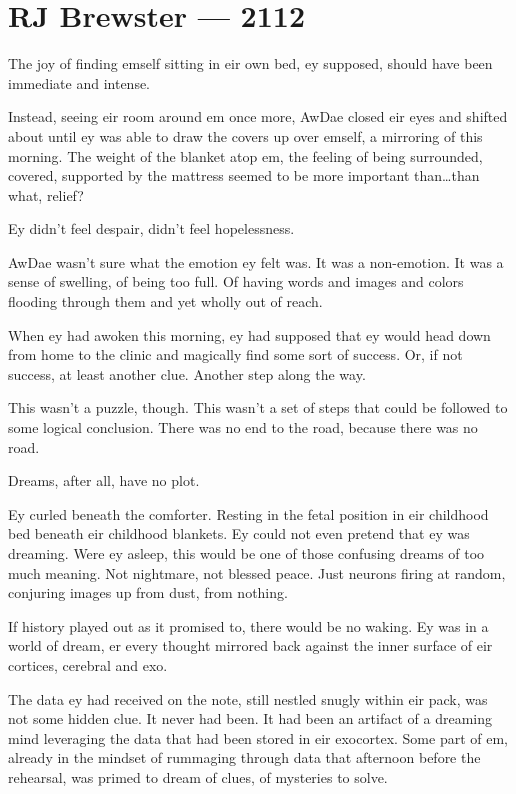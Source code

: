 \hypertarget{rj-brewster-2112}{%
\chapter*{RJ Brewster — 2112}\label{rj-brewster-2112}}

The joy of finding emself sitting in eir own bed, ey supposed, should have been immediate and intense.

Instead, seeing eir room around em once more, AwDae closed eir eyes and shifted about until ey was able to draw the covers up over emself, a mirroring of this morning. The weight of the blanket atop em, the feeling of being surrounded, covered, supported by the mattress seemed to be more important than\ldots{}than what, relief?

Ey didn't feel despair, didn't feel hopelessness.

AwDae wasn't sure what the emotion ey felt was. It was a non-emotion. It was a sense of swelling, of being too full. Of having words and images and colors flooding through them and yet wholly out of reach.

When ey had awoken this morning, ey had supposed that ey would head down from home to the clinic and magically find some sort of success. Or, if not success, at least another clue. Another step along the way.

This wasn't a puzzle, though. This wasn't a set of steps that could be followed to some logical conclusion. There was no end to the road, because there was no road.

Dreams, after all, have no plot.

Ey curled beneath the comforter. Resting in the fetal position in eir childhood bed beneath eir childhood blankets. Ey could not even pretend that ey was dreaming. Were ey asleep, this would be one of those confusing dreams of too much meaning. Not nightmare, not blessed peace. Just neurons firing at random, conjuring images up from dust, from nothing.

If history played out as it promised to, there would be no waking. Ey was in a world of dream, er every thought mirrored back against the inner surface of eir cortices, cerebral and exo.

The data ey had received on the note, still nestled snugly within eir pack, was not some hidden clue. It never had been. It had been an artifact of a dreaming mind leveraging the data that had been stored in eir exocortex. Some part of em, already in the mindset of rummaging through data that afternoon before the rehearsal, was primed to dream of clues, of mysteries to solve.

